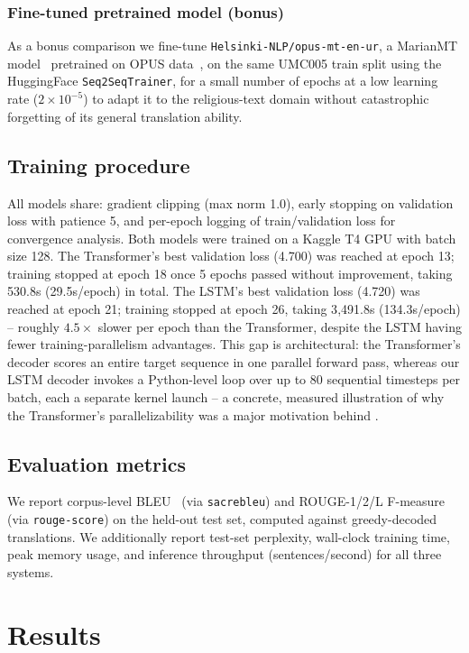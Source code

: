 \documentclass[conference]{IEEEtran}
\begin{document}
\subsubsection{Fine-tuned pretrained model (bonus)}
As a bonus comparison we fine-tune \texttt{Helsinki-NLP/opus-mt-en-ur}, a
MarianMT model~\cite{junczysdowmunt2018opus} pretrained on OPUS
data~\cite{tiedemann2020opus}, on the same UMC005 train split using the
HuggingFace \texttt{Seq2SeqTrainer}, for a small number of epochs at a low
learning rate ($2\times10^{-5}$) to adapt it to the religious-text domain
without catastrophic forgetting of its general translation ability.

\subsection{Training procedure}
All models share: gradient clipping (max norm 1.0), early stopping on
validation loss with patience 5, and per-epoch logging of train/validation
loss for convergence analysis. Both models were trained on a Kaggle T4 GPU
with batch size 128. The Transformer's best validation loss (4.700) was
reached at epoch 13; training stopped at epoch 18 once 5 epochs passed
without improvement, taking 530.8s (29.5s/epoch) in total. The LSTM's best
validation loss (4.720) was reached at epoch 21; training stopped at epoch
26, taking 3{,}491.8s (134.3s/epoch) -- roughly $4.5\times$ slower per epoch
than the Transformer, despite the LSTM having fewer training-parallelism
advantages. This gap is architectural: the Transformer's decoder scores an
entire target sequence in one parallel forward pass, whereas our LSTM
decoder invokes a Python-level loop over up to 80 sequential timesteps per
batch, each a separate kernel launch -- a concrete, measured illustration of
why the Transformer's parallelizability was a major motivation behind
\cite{vaswani2017attention}.

\subsection{Evaluation metrics}
We report corpus-level BLEU~\cite{papineni2002bleu} (via \texttt{sacrebleu})
and ROUGE-1/2/L F-measure~\cite{lin2004rouge} (via \texttt{rouge-score}) on
the held-out test set, computed against greedy-decoded translations. We
additionally report test-set perplexity, wall-clock training time, peak
memory usage, and inference throughput (sentences/second) for all three
systems.

\section{Results}
\end{document}
